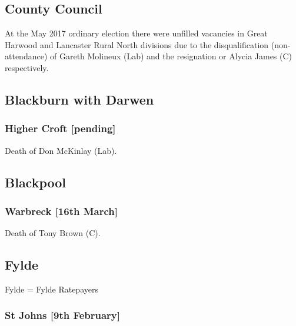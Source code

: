 \documentclass[a4paper,openany]{book}
\begin{document}
\begin{resultsiii}
\subsection*{County Council}

At the May 2017 ordinary election there were unfilled vacancies in Great Harwood and Lancaster Rural North divisions due to the disqualification (non-attendance) of Gareth Molineux (Lab) and the resignation or Alycia James (C) respectively.

\subsection*{Blackburn with Darwen}

\subsubsection*{Higher Croft \hspace*{\fill}\nolinebreak[1]%
\enspace\hspace*{\fill}
[pending]}


Death of Don McKinlay (Lab).

\subsection*{Blackpool}

\subsubsection*{Warbreck \hspace*{\fill}\nolinebreak[1]%
\enspace\hspace*{\fill}
[16th March]}


Death of Tony Brown (C).

\subsection*{Fylde}

Fylde = Fylde Ratepayers

\subsubsection*{St Johns \hspace*{\fill}\nolinebreak[1]%
\enspace\hspace*{\fill}
[9th February]}


\end{resultsiii}
\end{document}
